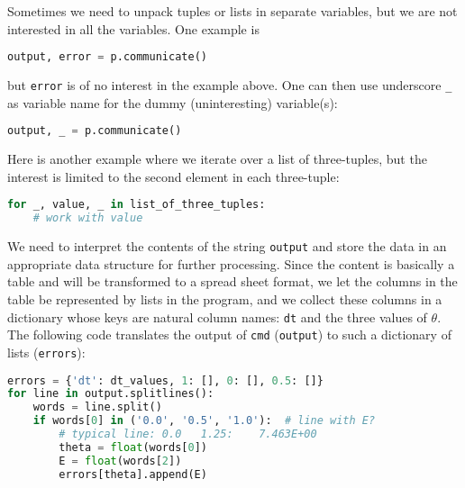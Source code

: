 \documentclass[graybox,sectrefs,envcountresetchap,open=right,final]{svmonodo}
\newenvironment{notice_mdfboxadmon}[1][]{
\begin{notice_mdfboxmdframed}[frametitle=#1]
}
{
\end{notice_mdfboxmdframed}
}
\begin{document}
\begin{notice_mdfboxadmon}
Sometimes we need to unpack tuples or lists in separate variables,
but we are not interested in all the variables. One example is



\begin{lstlisting}[language=python,style=blue1_bluegreen]
output, error = p.communicate()

\end{lstlisting}

but \texttt{error} is of no interest in the example above.
One can then use underscore \Verb!_! as variable name for the dummy
(uninteresting) variable(s):



\begin{lstlisting}[language=python,style=blue1_bluegreen]
output, _ = p.communicate()

\end{lstlisting}

Here is another example where we iterate over a list of three-tuples,
but the interest is limited to the second element in each three-tuple:




\begin{lstlisting}[language=python,style=blue1_bluegreen]
for _, value, _ in list_of_three_tuples:
    # work with value

\end{lstlisting}
\end{notice_mdfboxadmon} %



We need to interpret the contents of the string
\texttt{output} and store
the data in an appropriate data structure for further processing.
Since the content is basically a table and will be transformed to
a spread sheet format, we let the columns in the table be represented
by lists in the program,
and we collect these columns in a dictionary whose keys are natural
column names: \texttt{dt} and the three values of $\theta$.
The following code translates the output of \texttt{cmd} (\texttt{output})
to such a dictionary of lists (\texttt{errors}):










\begin{lstlisting}[language=python,style=blue1_bluegreen]
errors = {'dt': dt_values, 1: [], 0: [], 0.5: []}
for line in output.splitlines():
    words = line.split()
    if words[0] in ('0.0', '0.5', '1.0'):  # line with E?
        # typical line: 0.0   1.25:    7.463E+00
        theta = float(words[0])
        E = float(words[2])
        errors[theta].append(E)

\end{lstlisting}
\end{document}
